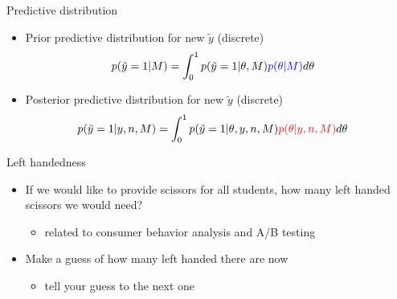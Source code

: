\documentclass[english,t]{beamer}
\begin{document}
\begin{frame}{Predictive distribution}

  \begin{itemize}
  \item {\color{blue} Prior predictive} distribution for new $\tilde{y}$ (discrete)
    \begin{align*}
      p(\tilde{y}=1|M) &= \int_0^1 p(\tilde{y}=1|\theta,M){\color{blue}p(\theta|M)}d\theta
    \end{align*}
  \item {\color{red} Posterior predictive} distribution for new $\tilde{y}$ (discrete)
    \begin{align*}
      p(\tilde{y}=1|y,n,M) &= \int_0^1 p(\tilde{y}=1|\theta,y,n,M){\color{red}p(\theta|y,n,M)}d\theta
    \end{align*}
  \end{itemize}
\end{frame}

\begin{frame}{Left handedness}

  \begin{itemize}
  \item<+-> If we would like to provide scissors for all students, how
    many left handed scissors we would need?
    \begin{itemize}
    \item related to consumer behavior analysis and A/B testing
  \end{itemize}
\item<+-> Make a guess of how many left handed there are now
  \begin{itemize}
  \item<+-> tell your guess to the next one
  \end{itemize}
\end{itemize}  

\end{frame}
\end{document}
